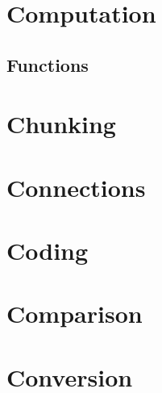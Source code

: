 \documentclass[a4paper]{article}
\begin{document}
\section{Computation}

\subsection{Functions}


\section{Chunking}

\section{Connections}

\section{Coding}

\section{Comparison}

\section{Conversion}

\end{document}
